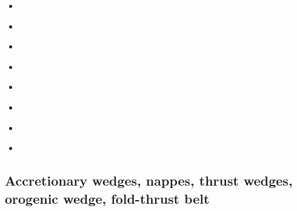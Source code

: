 \begin{scriptsize}
\begin{itemize}
\item[\twothousandeight] 
\cite{lejm08} 
\item[\twothousandnine] 
\cite{ligt09}
\cite{gogk09}
\item[\twothousandten] 
\cite{vayb10}
\item[\twothousandeleven] 
\cite{ligt11}
\cite{vacg11}
\item[\twothousandthirteen] 
\cite{vagc13}
\item[\twothousandfourteen] 
\cite{gobg14}
\cite{yadl14}
\item[\twothousandnineteen] 
\cite{neum19}
\cite{vayu19}
\item[\twothousandtwenty] 
\cite{onlw20}
\end{itemize}
\end{scriptsize}

\subsection{Accretionary wedges, nappes, thrust wedges, orogenic wedge, fold-thrust belt} 

